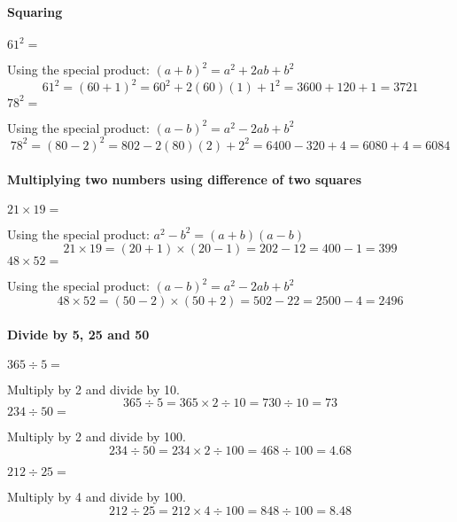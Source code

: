 \paragraph*{Squaring}
\begin{example}
\Item $61^2=$

Using the special product: $(a+b)^2=a^2+2ab+b^2$
\begin{equation*}
61^2 = (60 + 1)^2 = 60^2 + 2(60)(1) + 1^2 = 3600 + 120 + 1 = 3721
\end{equation*}
\Item $78^2=$

Using the special product: $(a-b)^2=a^2-2ab+b^2$
\begin{equation*}
78^2 = (80 - 2)^2 = 802 - 2(80)(2) + 2^2 = 6400 - 320 + 4 = 6080 + 4 = 6084
\end{equation*}
\end{example}
\paragraph*{Multiplying two numbers using difference of two squares}
\begin{example}
\Item $21\times 19=$

Using the special product: $a^2-b^2=(a+b)(a-b)$
\begin{equation*}
21 \times 19 = (20 + 1)\times (20 - 1) = 202 - 12 = 400 - 1 = 399
\end{equation*}
\Item $48\times 52=$

Using the special product: $(a-b)^2=a^2-2ab+b^2$
\begin{equation*}
48 \times 52 = (50 - 2)\times (50 + 2) = 502 - 22 = 2500 - 4 = 2496
\end{equation*}
\end{example}
\paragraph*{Divide by 5, 25 and 50}
\begin{example}
\Item $365\div 5=$

Multiply by 2 and divide by 10.
\begin{equation*}
365 \div 5 = 365 \times 2 \div 10 = 730 \div 10 = 73
\end{equation*}
\Item $234\div 50=$

Multiply by 2 and divide by 100.
\begin{equation*}
234 \div 50 = 234 \times 2 \div 100 = 468 \div 100 = 4.68
\end{equation*}

\Item $212\div 25=$

Multiply by 4 and divide by 100.
\begin{equation*}
212 \div 25 = 212 \times 4 \div 100 = 848 \div 100 = 8.48
\end{equation*}
\end{example}
